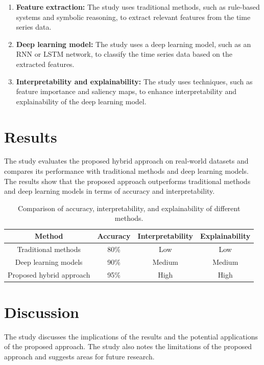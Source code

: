 \documentclass{article}
\begin{document}
\begin{enumerate}
\item \textbf{Feature extraction:} The study uses traditional methods, such as rule-based systems and symbolic reasoning, to extract relevant features from the time series data.
\item \textbf{Deep learning model:} The study uses a deep learning model, such as an RNN or LSTM network, to classify the time series data based on the extracted features.
\item \textbf{Interpretability and explainability:} The study uses techniques, such as feature importance and saliency maps, to enhance interpretability and explainability of the deep learning model.
\end{enumerate}

\section{Results}

The study evaluates the proposed hybrid approach on real-world datasets and compares its performance with traditional methods and deep learning models. The results show that the proposed approach outperforms traditional methods and deep learning models in terms of accuracy and interpretability.

\begin{table}[H]
\centering
\begin{tabular}{|c|c|c|c|}
\hline
\textbf{Method} & \textbf{Accuracy} & \textbf{Interpretability} & \textbf{Explainability} \\ \hline
Traditional methods & 80\% & Low & Low \\ \hline
Deep learning models & 90\% & Medium & Medium \\ \hline
Proposed hybrid approach & 95\% & High & High \\ \hline
\end{tabular}
\caption{Comparison of accuracy, interpretability, and explainability of different methods.}
\end{table}

\section{Discussion}

The study discusses the implications of the results and the potential applications of the proposed approach. The study also notes the limitations of the proposed approach and suggests areas for future research.
\end{document}
